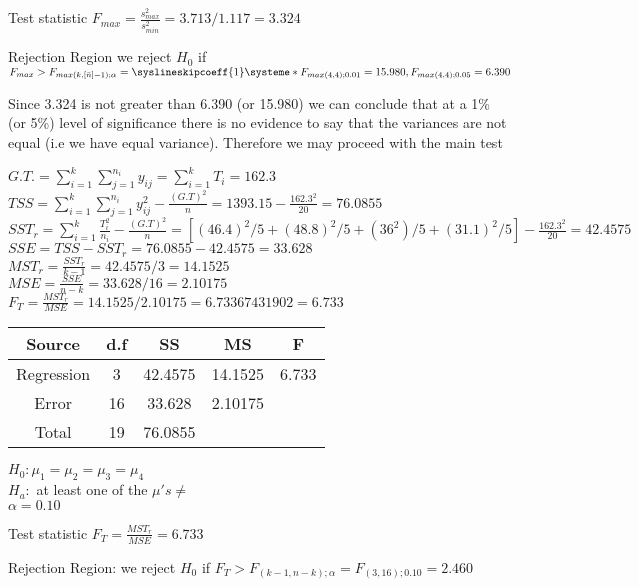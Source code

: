 \documentclass{article}
\begin{document}
Test statistic $F_{max} = \frac{s_{max}^2}{s_{min}^2} = 3.713 / 1.117 = 3.324$

Rejection Region we reject $H_0$ if $F_{max} > F_{max(k, [\bar{n}]-1); \alpha} =
\syslineskipcoeff{1}
\systeme*{F_{max(4, 4);0.01}=15.980,F_{max(4,4);0.05} = 6.390}
$

Since 3.324 is not greater than 6.390 (or 15.980) we can conclude that at a 1\% (or 5\%) level of significance there is no evidence to say that the variances are not equal (i.e we have equal variance). Therefore we may proceed with the main test

$G.T. = \sum_{i=1}^{k}{ \sum_{j=1}^{n_i}{y_{ij}}} = \sum_{i=1}^{k}{T_i} = 162.3$ \\
$TSS = \sum_{i=1}^{k}{ \sum_{j=1}^{n_i}{y_{ij}^2}} - \frac{(G.T)^2}{n} = 1393.15 - \frac{162.3^2}{20} = 76.0855$ \\
$SST_r = \sum_{i=1}^{k}{ \frac{T_i^2}{n_i}} - \frac{(G.T)^2}{n}  = [(46.4)^2/5 + (48.8)^2/5 + (36^2)/5 + (31.1)^2/5] - \frac{162.3^2}{20} = 42.4575$ \\
$SSE = TSS - SST_r = 76.0855 - 42.4575 = 33.628$\\
$MST_r = \frac{SST_r}{k - 1} = 42.4575 / 3 = 14.1525$ \\
$MSE = \frac{SSE}{n - k} = 33.628/16 = 2.10175$ \\
$F_T = \frac{MST_r}{MSE} = 14.1525/2.10175 = 6.73367431902 = 6.733$ \\


\begin{center}
 \begin{tabular}{||c c c c c||} 
 \hline
Source & d.f & SS & MS & F \\ [0.5ex] 
 \hline\hline
Regression & 3 & 42.4575 & 14.1525 & 6.733 \\
 \hline
Error & 16 & 33.628 & 2.10175 &  \\
 \hline
Total & 19  &  76.0855 & & \\ [1ex]
 \hline
\end{tabular}
\end{center}

$H_0: \mu_1 = \mu_2 = \mu_3 = \mu_4$ \\
$H_a:$ at least one of the $\mu's \neq$ \\
$\alpha = 0.10$

Test statistic $F_T = \frac{MST_r}{MSE} = 6.733$

Rejection Region: we reject $H_0$ if $F_T > F_{(k-1, n-k);\alpha} = F_{(3, 16);0.10} = 2.460$
\end{document}
